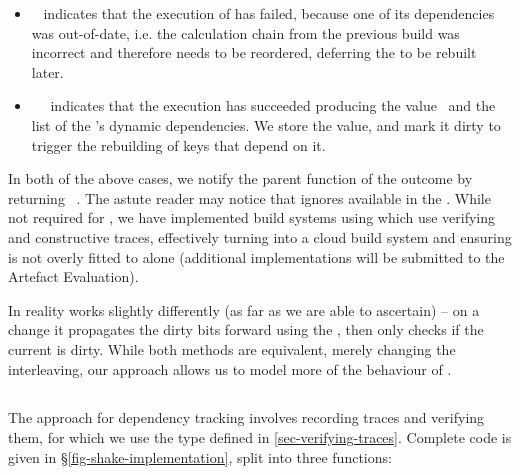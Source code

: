 \begin{itemize}
    \item {}~ indicates that the execution of  has
    failed, because one of its dependencies  was out-of-date, i.e. the
    calculation chain from the previous build was incorrect and therefore needs
    to be reordered, deferring the  to be rebuilt later.
    \item {}~~ indicates that the
    execution has succeeded producing the value~ and the list of the
    's dynamic dependencies. We store the value, and mark it dirty to
    trigger the rebuilding of keys that depend on it.
\end{itemize}

In both of the above cases, we notify the parent  function of
the outcome by returning ~. The astute reader may notice
that  ignores  available in the .
While not required for \Excel, we have implemented build systems using
 which use verifying and constructive traces, effectively turning
\Excel into a cloud build system and ensuring  is not overly
fitted to \Excel alone (additional implementations will be submitted to the
Artefact Evaluation).

In reality \Excel works slightly differently (as far as we are able to ascertain) --
on a change it propagates the dirty bits forward using the , then only checks if the current  is dirty. While both methods are equivalent, merely changing the interleaving, our approach allows us to model more of the behaviour of \Excel.

\subsection{\Shake}\label{sec-implementation-shake}

The \Shake approach for dependency tracking involves recording traces and verifying them, for which we use the  type defined in \ref{sec-verifying-traces}. Complete code is given in \S\ref{fig-shake-implementation}, split into three functions:

